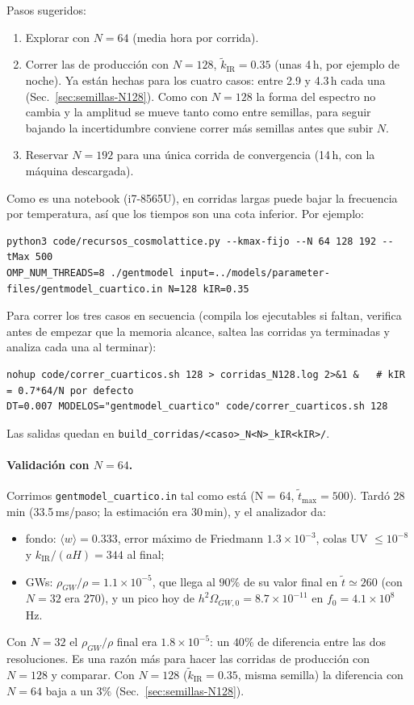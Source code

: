 \documentclass[11pt]{article}
\begin{document}
            Pasos sugeridos:
            \begin{enumerate}
                \item Explorar con $N = 64$ (media hora por corrida).
                \item Correr las de producción con $N = 128$, $\tilde k_{\text{IR}} = 0.35$ (unas 4\,h, por ejemplo de noche). Ya están hechas para los cuatro casos: entre 2.9 y 4.3\,h cada una (Sec.~\ref{sec:semillas-N128}). Como con $N = 128$ la forma del espectro no cambia y la amplitud se mueve tanto como entre semillas, para seguir bajando la incertidumbre conviene correr más semillas antes que subir $N$.
                \item Reservar $N = 192$ para una única corrida de convergencia (14\,h, con la máquina descargada).
            \end{enumerate}
            Como es una notebook (i7-8565U), en corridas largas puede bajar la frecuencia por temperatura, así que los tiempos son una cota inferior. Por ejemplo:
            {\footnotesize\begin{verbatim}
python3 code/recursos_cosmolattice.py --kmax-fijo --N 64 128 192 --tMax 500
OMP_NUM_THREADS=8 ./gentmodel input=../models/parameter-files/gentmodel_cuartico.in N=128 kIR=0.35
            \end{verbatim}}
            Para correr los tres casos en secuencia (compila los ejecutables si faltan, verifica antes de empezar que la memoria alcance, saltea las corridas ya terminadas y analiza cada una al terminar):
            {\footnotesize\begin{verbatim}
nohup code/correr_cuarticos.sh 128 > corridas_N128.log 2>&1 &   # kIR = 0.7*64/N por defecto
DT=0.007 MODELOS="gentmodel_cuartico" code/correr_cuarticos.sh 128
            \end{verbatim}}
            Las salidas quedan en \texttt{build\_corridas/<caso>\_N<N>\_kIR<kIR>/}.
            \paragraph{Validación con $N = 64$.} Corrimos \texttt{gentmodel\_cuartico.in} tal como está (N = 64, $\tilde t_{\max} = 500$). Tardó 28\,min (33.5\,ms/paso; la estimación era 30\,min), y el analizador da:
            \begin{itemize}
                \item fondo: $\langle w\rangle = 0.333$, error máximo de Friedmann $1.3 \times 10^{-3}$, colas UV $\le 10^{-8}$ y $k_{\text{IR}}/(aH) = 344$ al final;
                \item GWs: $\rho_{GW}/\rho = 1.1 \times 10^{-5}$, que llega al $90\%$ de su valor final en $\tilde t \simeq 260$ (con $N = 32$ era $270$), y un pico hoy de $h^2\Omega_{GW,0} = 8.7 \times 10^{-11}$ en $f_0 = 4.1 \times 10^8$\,Hz.
            \end{itemize}
            Con $N = 32$ el $\rho_{GW}/\rho$ final era $1.8 \times 10^{-5}$: un $40\%$ de diferencia entre las dos resoluciones. Es una razón más para hacer las corridas de producción con $N = 128$ y comparar. Con $N = 128$ ($\tilde k_{\text{IR}} = 0.35$, misma semilla) la diferencia con $N = 64$ baja a un $3\%$ (Sec.~\ref{sec:semillas-N128}).
\end{document}
